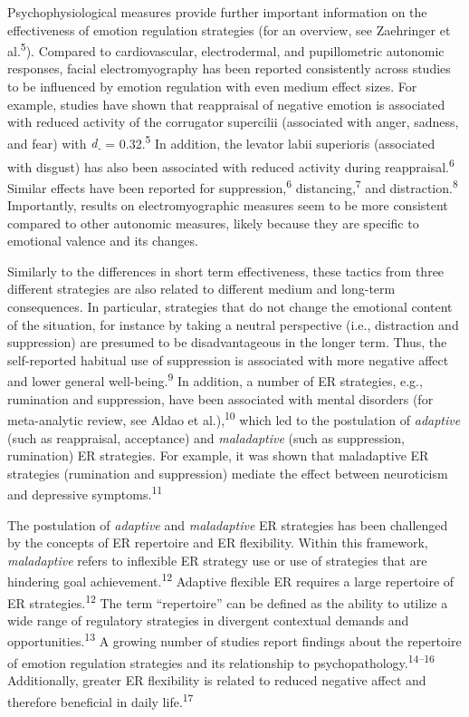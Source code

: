 \documentclass[
  english,
  man,floatsintext]{apa6}
\begin{document}
Psychophysiological measures provide further important information on the effectiveness of emotion regulation strategies (for an overview, see Zaehringer et al.\textsuperscript{5}).
Compared to cardiovascular, electrodermal, and pupillometric autonomic responses, facial electromyography has been reported consistently across studies to be influenced by emotion regulation with even medium effect sizes.
For example, studies have shown that reappraisal of negative emotion is associated with reduced activity of the corrugator supercilii (associated with anger, sadness, and fear) with \emph{d\textsubscript{-}} = 0.32.\textsuperscript{5}
In addition, the levator labii superioris (associated with disgust) has also been associated with reduced activity during reappraisal.\textsuperscript{6}
Similar effects have been reported for suppression,\textsuperscript{6} distancing,\textsuperscript{7} and distraction.\textsuperscript{8}
Importantly, results on electromyographic measures seem to be more consistent compared to other autonomic measures, likely because they are specific to emotional valence and its changes.

Similarly to the differences in short term effectiveness, these tactics from three different strategies are also related to different medium and long-term consequences.
In particular, strategies that do not change the emotional content of the situation, for instance by taking a neutral perspective (i.e., distraction and suppression) are presumed to be disadvantageous in the longer term.
Thus, the self-reported habitual use of suppression is associated with more negative affect and lower general well-being.\textsuperscript{9}
In addition, a number of ER strategies, e.g., rumination and suppression, have been associated with mental disorders (for meta-analytic review, see Aldao et al.),\textsuperscript{10} which led to the postulation of \emph{adaptive} (such as reappraisal, acceptance) and \emph{maladaptive} (such as suppression, rumination) ER strategies.
For example, it was shown that maladaptive ER strategies (rumination and suppression) mediate the effect between neuroticism and depressive symptoms.\textsuperscript{11}

The postulation of \emph{adaptive} and \emph{maladaptive} ER strategies has been challenged by the concepts of ER repertoire and ER flexibility.
Within this framework, \emph{maladaptive} refers to inflexible ER strategy use or use of strategies that are hindering goal achievement.\textsuperscript{12}
Adaptive flexible ER requires a large repertoire of ER strategies.\textsuperscript{12}
The term ``repertoire'' can be defined as the ability to utilize a wide range of regulatory strategies in divergent contextual demands and opportunities.\textsuperscript{13}
A growing number of studies report findings about the repertoire of emotion regulation strategies and its relationship to psychopathology.\textsuperscript{14--16}
Additionally, greater ER flexibility is related to reduced negative affect and therefore beneficial in daily life.\textsuperscript{17}
\end{document}
